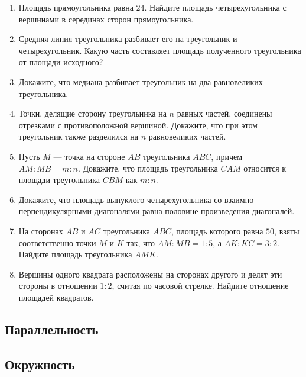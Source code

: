 \documentclass[10pt, a4paper]{article}
\begin{document}
\begin{enumerate}
		\item Площадь прямоугольника равна $24$. Найдите площадь четырехугольника с вершинами в серединах сторон прямоугольника.
		\item Средняя линия треугольника разбивает его на треугольник и четырехугольник. Какую часть составляет площадь полученного треугольника от площади исходного?
		\item Докажите, что медиана разбивает треугольник на два равновеликих треугольника.
		\item Точки, делящие сторону треугольника на $n$ равных частей, соединены отрезками с противоположной вершиной. Докажите, что при этом треугольник также разделился на $n$ равновеликих частей.
		\item Пусть $M$ — точка на стороне $AB$ треугольника $ABC$, причем $AM : MB = m : n$. Докажите, что площадь треугольника $CAM$ относится к площади треугольника $CBM$ как $m : n$.
		\item Докажите, что площадь выпуклого четырехугольника со взаимно перпендикулярными диагоналями равна половине произведения диагоналей.
		\item На сторонах $AB$ и $AC$ треугольника $ABC$, площадь которого равна $50$, взяты соответственно точки $M$ и $K$ так, что $AM : MB = 1 : 5$, а $AK : KC = 3 : 2$. Найдите площадь треугольника $AMK$.
		\item Вершины одного квадрата расположены на сторонах другого и делят эти стороны в отношении $1 : 2$, считая по часовой стрелке. Найдите отношение площадей квадратов.
	\end{enumerate}
\subsection{Параллельность}
\subsection{Окружность}
\end{document}
